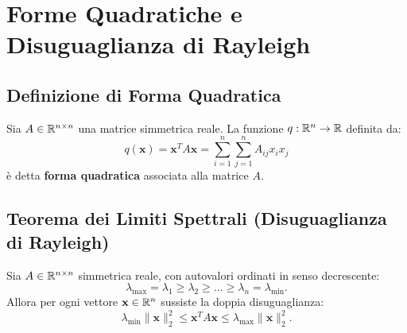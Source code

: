 \FloatBarrier
\section{Forme Quadratiche e Disuguaglianza di Rayleigh}
\label{sec:forme-quadratiche-rayleigh}

\subsection{Definizione di Forma Quadratica}

\begin{definition}
Sia $A \in \mathbb{R}^{n \times n}$ una matrice simmetrica reale. La funzione $q: \mathbb{R}^n \to \mathbb{R}$ definita da:
\begin{equation}
    q(\mathbf{x}) = \mathbf{x}^T A \mathbf{x} = \sum_{i=1}^n \sum_{j=1}^n A_{ij} x_i x_j
\end{equation}
\`e detta \textbf{forma quadratica} associata alla matrice $A$.
\end{definition}

\subsection{Teorema dei Limiti Spettrali (Disuguaglianza di Rayleigh)}

\begin{theorem}
\label{thm:limiti-spettrali}
Sia $A \in \mathbb{R}^{n \times n}$ simmetrica reale, con autovalori ordinati in senso decrescente:
\begin{equation}
    \lambda_{\max} = \lambda_1 \ge \lambda_2 \ge \dots \ge \lambda_n = \lambda_{\min}.
\end{equation}
Allora per ogni vettore $\mathbf{x} \in \mathbb{R}^n$ sussiste la doppia disuguaglianza:
\begin{equation}
    \lambda_{\min} \|\mathbf{x}\|_2^2 \le \mathbf{x}^T A \mathbf{x} \le \lambda_{\max} \|\mathbf{x}\|_2^2.
\end{equation}
\end{theorem}


